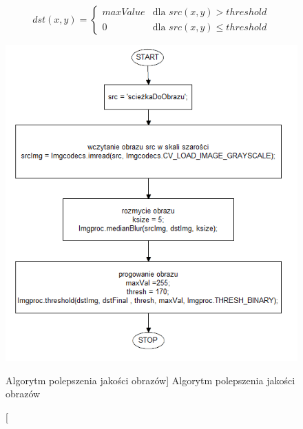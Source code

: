 \documentclass[a4paper,12pt]{article}
\begin{document}
			    \begin{displaymath}
                    dst (x, y) =  
                    \left\{
                        \begin{array}{ll}
                            maxValue & \textrm{dla } src (x, y) > threshold \\
                            0 & \textrm{dla } src (x, y) \leqslant threshold
                        \end{array}
                    \right.
                \end{displaymath}
			    
			    \newpage
    		    
    		    \begin{figure}[!ht]  
    			    \begin{center}
    			        \includegraphics[]{image//algorithm//improveImg.png}%
    			    \end{center}
    			    \caption
        			    [Algorytm polepszenia jakości obrazów]  
	    		        {Algorytm polepszenia jakości obrazów}  
    		    \end{figure}
		
                \newpage
		
\end{document}
